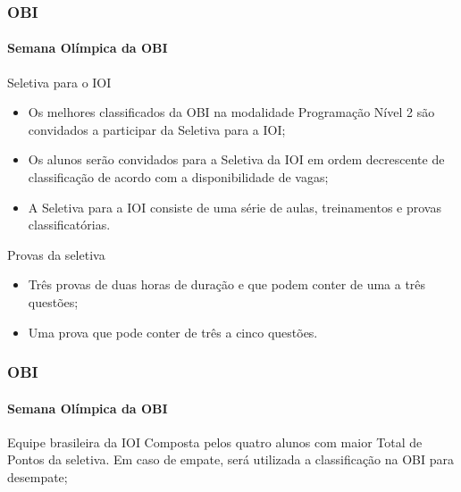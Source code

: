 \begin{frame}
	\frametitle{OBI}
	\framesubtitle{Semana Olímpica da OBI}
 
	\begin{block:concept}{Seletiva para o IOI}
		\begin{itemize}
			\item Os melhores classificados da OBI na modalidade Programação Nível 2
			são convidados a participar da Seletiva para a IOI;

			\item Os alunos serão convidados para a Seletiva da IOI em ordem
			decrescente de classificação de acordo com a disponibilidade de vagas;
	
			\item A Seletiva para a IOI consiste de uma série de aulas, treinamentos
			e provas classificatórias. 
		\end{itemize}
	\end{block:concept}

	
	\begin{block:fact}{Provas da seletiva}
		\begin{itemize}
			\item Três provas de duas horas de duração e que podem conter de uma a três questões;
			\item Uma prova que pode conter de três a cinco questões.
		\end{itemize}
	\end{block:fact}
\end{frame}


\begin{frame}
	\frametitle{OBI}
	\framesubtitle{Semana Olímpica da OBI}
 
	\begin{block:fact}{Equipe brasileira da IOI}
		Composta pelos quatro alunos com maior Total de Pontos da seletiva.
		Em caso de empate, será utilizada a classificação na OBI para desempate;
	\end{block:fact}
\end{frame}
